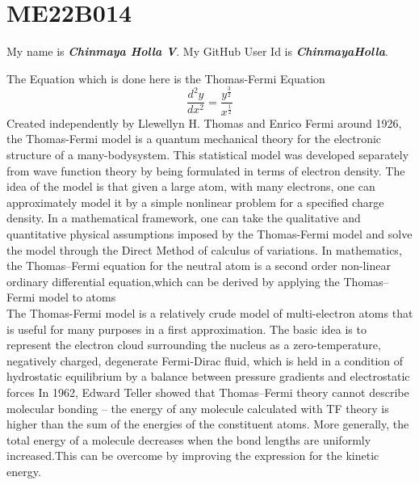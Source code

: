 \section{ME22B014}
My name is  \textbf{\textit{Chinmaya Holla V}}.\newline
My GitHub User Id is \textbf{\textit{ChinmayaHolla}}.
\newline

The Equation which is done here is the Thomas-Fermi Equation
\begin{equation}
\frac{d^2y}{dx^2} = \frac{y^\frac{3}{2}}{x^\frac{1}{2}}
\end{equation}
\newline
\newline
Created independently by Llewellyn H. Thomas and Enrico Fermi around 1926, the Thomas-Fermi model is a quantum mechanical theory for the electronic structure of a many-bodysystem. This statistical model was developed separately from wave function theory by being formulated in terms of electron density. The idea of the model is that given a large atom, with many electrons, one can approximately model it by a simple nonlinear problem for a specified charge density. In a mathematical framework, one can take the qualitative and quantitative physical assumptions imposed by the Thomas-Fermi model and solve the model through the Direct Method of calculus of variations. In mathematics, the Thomas–Fermi equation for the neutral atom is a second order non-linear ordinary differential equation,which can be derived by applying the Thomas–Fermi model to atoms
\newline
\\
The Thomas-Fermi model is a relatively crude model of multi-electron atoms that is useful for many purposes in a first approximation. The basic idea is to represent the electron cloud surrounding the nucleus as a zero-temperature, negatively charged, degenerate Fermi-Dirac fluid, which is held in a condition of hydrostatic equilibrium by a balance between pressure gradients and electrostatic forces
\newline
In 1962, Edward Teller showed that Thomas–Fermi theory cannot describe molecular bonding – the energy of any molecule calculated with TF theory is higher than the sum of the energies of the constituent atoms. More generally, the total energy of a molecule decreases when the bond lengths are uniformly increased.This can be overcome by improving the expression for the kinetic energy.
